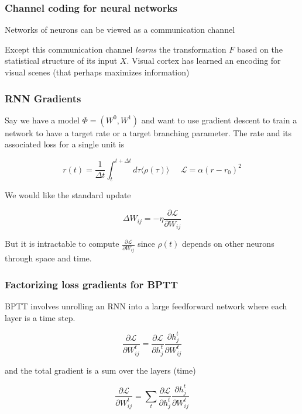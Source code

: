 \documentclass{beamer}
\begin{document}
\begin{frame}[plain]
\frametitle{Channel coding for neural networks} 

Networks of neurons can be viewed as a communication channel

Except this communication channel \emph{learns} the transformation $F$ based on the statistical structure of its input $X$. Visual cortex has learned an encoding for visual scenes (that perhaps maximizes information)

\end{frame}


\begin{frame}[plain]
\frametitle{RNN Gradients} 

Say we have a model $\Phi = (W^{0},W^{1})$ and want to use gradient descent to train a network to have a target rate or a target branching parameter. The rate and its associated loss for a single unit is

\begin{equation*}
r(t) = \frac{1}{\Delta t}\int_{t}^{t+\Delta t} d\tau \langle \rho(\tau)\rangle\;\;\;\;\;\mathcal{L} = \alpha(r-r_{0})^{2}
\end{equation*}

We would like the standard update 

\begin{equation*}
\Delta W_{ij} = -\eta \frac{\partial\mathcal{L}}{\partial W_{ij}}
\end{equation*}


But it is intractable to compute $\frac{\partial\mathcal{L}}{\partial W_{ij}}$ since $\rho(t)$ depends on other neurons through space and time.


\end{frame}


\begin{frame}[plain]
\frametitle{Factorizing loss gradients for BPTT} 

BPTT involves unrolling an RNN into a large feedforward network where each layer is a time step. 

\begin{equation*}
\frac{\partial\mathcal{L}}{\partial W^{t}_{ij}} = \frac{\partial\mathcal{L}}{\partial h^{t}_{j}}  \frac{\partial h^{t}_{j}}{{\partial W^{t}_{ij}}} 
\end{equation*}

and the total gradient is a sum over the layers (time)

\begin{equation*}
\frac{\partial\mathcal{L}}{\partial W^{t}_{ij}} = \sum_{t} \frac{\partial\mathcal{L}}{\partial h^{t}_{j}}  \frac{\partial h^{t}_{j}}{{\partial W^{t}_{ij}}} 
\end{equation*}

\end{frame}
\end{document}
